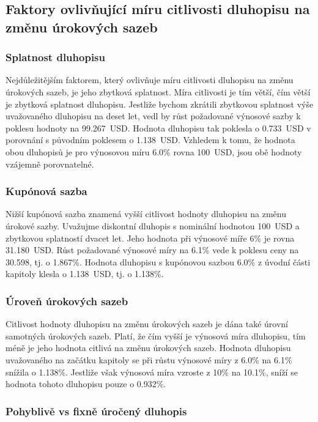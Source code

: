\documentclass[a4paper]{book}
\begin{document}
\subsection{Faktory ovlivňující míru citlivosti dluhopisu na změnu úrokových sazeb}

\subsubsection{Splatnost dluhopisu}

Nejdůležitějším faktorem, který ovlivňuje míru citlivosti dluhopisu na změnu úrokových sazeb, je jeho zbytková splatnost. Míra citlivosti je tím větší, čím větší je zbytková splatnost dluhopisu. Jestliže bychom zkrátili zbytkovou splatnost výše uvažovaného dluhopisu na deset let, vedl by růst požadované výnosové sazby k poklesu hodnoty na 99.267~USD. Hodnota dluhopisu tak poklesla o 0.733~USD v porovnání s původním poklesem o 1.138~USD. Vzhledem k tomu, že hodnota obou dluhopisů je pro výnosovou míru 6.0\% rovna 100~USD, jsou obě hodnoty vzájemně porovnatelné.

\subsubsection{Kupónová sazba}

Nižší kupónová sazba znamená vyšší citlivost hodnoty dluhopisu na změnu úrokové sazby. Uvažujme diskontní dluhopis s nominální hodnotou 100~USD a zbytkovou splatností dvacet let. Jeho hodnota při výnosové míře 6\% je rovna 31.180~USD. Růst požadované výnosové míry na 6.1\% vede k poklesu ceny na 30.598, tj. o 1.867\%. Hodnota dluhopisu s kupónovou sazbou 6.0\% z úvodní části kapitoly klesla o 1.138~USD, tj. o 1.138\%.

\subsubsection{Úroveň úrokových sazeb}

Citlivost hodnoty dluhopisu na změnu úrokových sazeb je dána také úrovní samotných úrokových sazeb. Platí, že čím vyšší je výnosová míra dluhopisu, tím méně je jeho hodnota citlivá na změnu úrokových sazeb. Hodnota dluhopisu uvažovaného na začátku kapitoly se při růstu výnosové míry z 6.0\% na 6.1\% snížila o 1.138\%. Jestliže však výnosová míra vzroste z 10\% na 10.1\%, sníží se hodnota tohoto dluhopisu pouze o 0.932\%. 

\subsubsection{Pohyblivě vs fixně úročený dluhopis}
\end{document}
